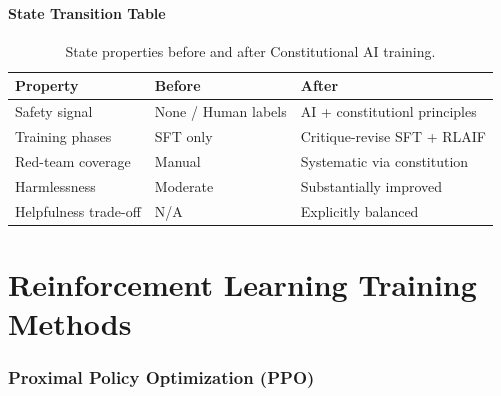 \subsection{State Transition Table}
\begin{table}[h]\centering
\begin{tabular}{lll}\toprule
\textbf{Property} & \textbf{Before} & \textbf{After}\\\midrule
Safety signal & None / Human labels & AI + constitutionl principles\\
Training phases & SFT only & Critique-revise SFT + RLAIF\\
Red-team coverage & Manual & Systematic via constitution\\
Harmlessness & Moderate & Substantially improved\\
Helpfulness trade-off & N/A & Explicitly balanced\\\bottomrule
\end{tabular}
\caption{State properties before and after Constitutional AI training.}
\end{table}

\newpage
\part{Reinforcement Learning Training Methods}

\section{Proximal Policy Optimization (PPO)}

